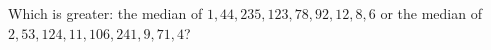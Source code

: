 Which is greater: the median of $1,44,235,123,78,92,12,8,6$ or the median of $2,53,124,11,106,241,9,71,4$?
